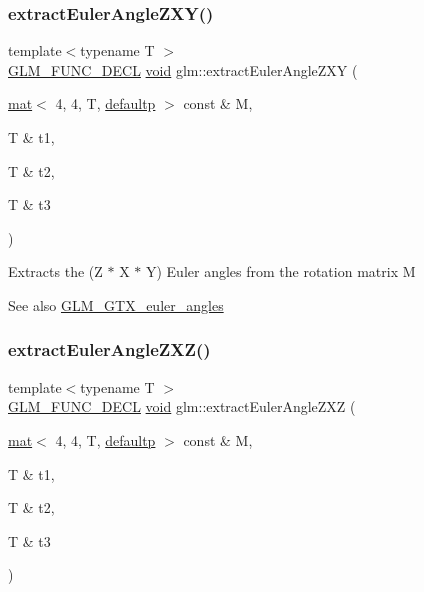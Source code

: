 \subsubsection{\texorpdfstring{extract\+Euler\+Angle\+Z\+X\+Y()}{extractEulerAngleZXY()}}
{\footnotesize\ttfamily template$<$typename T $>$ \\
\hyperlink{setup_8hpp_ab2d052de21a70539923e9bcbf6e83a51}{G\+L\+M\+\_\+\+F\+U\+N\+C\+\_\+\+D\+E\+CL} \hyperlink{_s_d_l__opengles2__gl2ext_8h_ae5d8fa23ad07c48bb609509eae494c95}{void} glm\+::extract\+Euler\+Angle\+Z\+XY (\begin{DoxyParamCaption}\item[{\hyperlink{structglm_1_1mat}{mat}$<$ 4, 4, T, \hyperlink{namespaceglm_a36ed105b07c7746804d7fdc7cc90ff25a9d21ccd8b5a009ec7eb7677befc3bf51}{defaultp} $>$ const \&}]{M,  }\item[{T \&}]{t1,  }\item[{T \&}]{t2,  }\item[{T \&}]{t3 }\end{DoxyParamCaption})}

Extracts the (Z $\ast$ X $\ast$ Y) Euler angles from the rotation matrix M \begin{DoxySeeAlso}{See also}
\hyperlink{group__gtx__euler__angles}{G\+L\+M\+\_\+\+G\+T\+X\+\_\+euler\+\_\+angles} 
\end{DoxySeeAlso}
\mbox{\label{group__gtx__euler__angles_ga59359fef9bad92afaca55e193f91e702}} 
\subsubsection{\texorpdfstring{extract\+Euler\+Angle\+Z\+X\+Z()}{extractEulerAngleZXZ()}}
{\footnotesize\ttfamily template$<$typename T $>$ \\
\hyperlink{setup_8hpp_ab2d052de21a70539923e9bcbf6e83a51}{G\+L\+M\+\_\+\+F\+U\+N\+C\+\_\+\+D\+E\+CL} \hyperlink{_s_d_l__opengles2__gl2ext_8h_ae5d8fa23ad07c48bb609509eae494c95}{void} glm\+::extract\+Euler\+Angle\+Z\+XZ (\begin{DoxyParamCaption}\item[{\hyperlink{structglm_1_1mat}{mat}$<$ 4, 4, T, \hyperlink{namespaceglm_a36ed105b07c7746804d7fdc7cc90ff25a9d21ccd8b5a009ec7eb7677befc3bf51}{defaultp} $>$ const \&}]{M,  }\item[{T \&}]{t1,  }\item[{T \&}]{t2,  }\item[{T \&}]{t3 }\end{DoxyParamCaption})}


